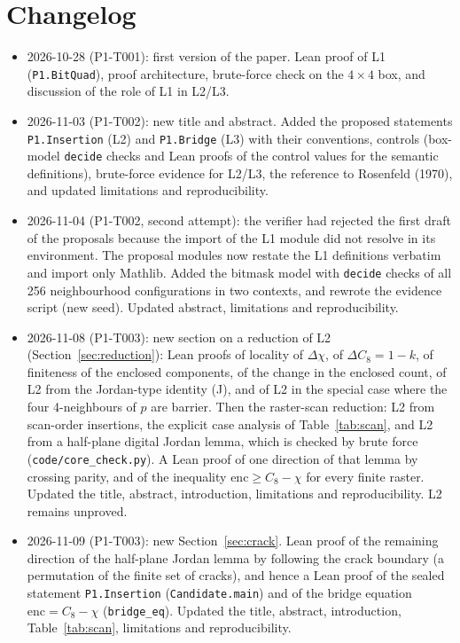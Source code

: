 \documentclass[11pt]{article}
\theoremstyle{definition}
\theoremstyle{remark}
\begin{document}
\section*{Changelog}
\begin{itemize}
\item 2026-10-28 (P1-T001): first version of the paper. Lean proof of L1
  (\texttt{P1.BitQuad}), proof architecture, brute-force check on the
  $4\times4$ box, and discussion of the role of L1 in L2/L3.
\item 2026-11-03 (P1-T002): new title and abstract. Added the proposed
  statements \texttt{P1.Insertion} (L2) and \texttt{P1.Bridge} (L3) with their
  conventions, controls (box-model \texttt{decide} checks and Lean proofs of the
  control values for the semantic definitions), brute-force evidence for L2/L3,
  the reference to Rosenfeld (1970), and updated limitations and reproducibility.
\item 2026-11-04 (P1-T002, second attempt): the verifier had rejected the first
  draft of the proposals because the import of the L1 module did not resolve in its
  environment. The proposal modules now restate the L1 definitions verbatim and
  import only Mathlib. Added the bitmask model with \texttt{decide} checks of all
  256 neighbourhood configurations in two contexts, and rewrote the evidence
  script (new seed). Updated abstract, limitations and reproducibility.
\item 2026-11-08 (P1-T003): new section on a reduction of L2
  (Section~\ref{sec:reduction}): Lean proofs of locality of $\Delta\chi$,
  of $\Delta C_8 = 1-k$, of finiteness of the enclosed components, of the change
  in the enclosed count, of L2 from the Jordan-type identity (J), and of L2 in
  the special case where the four 4-neighbours of $p$ are barrier. Then the
  raster-scan reduction: L2 from scan-order insertions, the explicit case analysis
  of Table~\ref{tab:scan}, and L2 from a half-plane digital Jordan lemma, which is
  checked by brute force (\texttt{code/core\_check.py}). A Lean proof of one
  direction of that lemma by crossing parity, and of the inequality
  $\mathrm{enc}\ge C_8-\chi$ for every finite raster. Updated the title, abstract, introduction,
  limitations and reproducibility. L2 remains unproved.
\item 2026-11-09 (P1-T003): new Section~\ref{sec:crack}. Lean proof of the remaining
  direction of the half-plane Jordan lemma by following the crack boundary
  (a permutation of the finite set of cracks), and hence a Lean proof of the sealed
  statement \texttt{P1.Insertion} (\texttt{Candidate.main}) and of the bridge
  equation $\mathrm{enc}=C_8-\chi$ (\texttt{bridge\_eq}). Updated the title, abstract,
  introduction, Table~\ref{tab:scan}, limitations and reproducibility.
\end{itemize}



\end{document}
